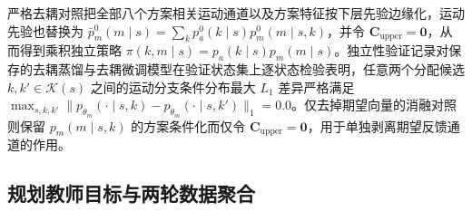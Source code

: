 严格去耦对照把全部八个方案相关运动通道以及方案特征按下层先验边缘化，运动先验也替换为 $\bar p_m^0(m\mid s)=\sum_kp_a^0(k\mid s)p_m^0(m\mid s,k)$，并令 $\mathbf C_{\mathrm{upper}}=\mathbf 0$，从而得到乘积独立策略 $\pi(k,m\mid s)=p_a(k\mid s)p_m(m\mid s)$。独立性验证记录对保存的去耦蒸馏与去耦微调模型在验证状态集上逐状态检验表明，任意两个分配候选 $k,k'\in\mathcal K(s)$ 之间的运动分支条件分布最大 $L_1$ 差异严格满足 $\max_{s,k,k'}\|p_{\theta_m}(\cdot\mid s,k)-p_{\theta_m}(\cdot\mid s,k')\|_1=0.0$。仅去掉期望向量的消融对照则保留 $p_m(m\mid s,k)$ 的方案条件化而仅令 $\mathbf C_{\mathrm{upper}}=\mathbf 0$，用于单独剥离期望反馈通道的作用。

\subsection{规划教师目标与两轮数据聚合}

